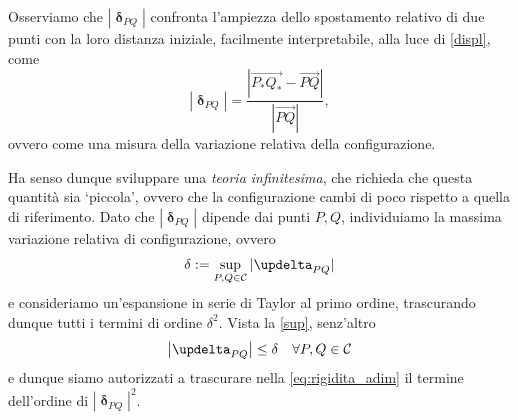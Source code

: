 Osserviamo che $|\bm{\updelta}_{PQ} |$ confronta l'ampiezza dello spostamento relativo di due punti con la loro distanza iniziale, facilmente interpretabile, alla luce di \eqref{displ}, come 
\begin{equation}
	|\bm{\updelta}_{PQ} |=\frac{\left|\overrightarrow{P_*Q_*}-\overrightarrow{PQ}\right|}{|\overrightarrow{PQ}|},
\end{equation}
ovvero come una  misura della variazione relativa della configurazione.

Ha senso dunque sviluppare una \textit{teoria infinitesima}, che richieda che questa quantità sia `piccola', ovvero che la configurazione cambi di poco rispetto a quella di riferimento. 
Dato che $|\bm{\updelta}_{PQ} |$ dipende dai punti $P, Q$, individuiamo la massima variazione relativa di configurazione, ovvero
\begin{equation}\label{sup}
	\delta:=\sup_{P, Q	\in\Cc} |\bm{\updelta}_{PQ} |
\end{equation}
e consideriamo un'espansione  in serie di Taylor al primo ordine, trascurando dunque  tutti i termini di ordine $\delta^2$. Vista la \eqref{sup}, senz'altro
\begin{equation}
	\left|\bm{\updelta}_{PQ}\right|\leq \delta \quad \forall P,Q\in \Cc
\end{equation}
e dunque siamo autorizzati a trascurare nella \eqref{eq:rigidita_adim} il termine dell'ordine di $|\bm{\updelta}_{PQ}|^2$.

